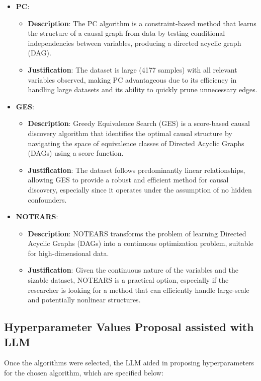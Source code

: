 \documentclass{article}
\begin{document}
\begin{itemize}

\item \textbf{PC}:
\begin{itemize}
    \item \textbf{Description}: The PC algorithm is a constraint-based method that learns the structure of a causal graph from data by testing conditional independencies between variables, producing a directed acyclic graph (DAG).
    \item \textbf{Justification}: The dataset is large (4177 samples) with all relevant variables observed, making PC advantageous due to its efficiency in handling large datasets and its ability to quickly prune unnecessary edges.
\end{itemize}

\item \textbf{GES}:
\begin{itemize}
    \item \textbf{Description}: Greedy Equivalence Search (GES) is a score-based causal discovery algorithm that identifies the optimal causal structure by navigating the space of equivalence classes of Directed Acyclic Graphs (DAGs) using a score function.
    \item \textbf{Justification}: The dataset follows predominantly linear relationships, allowing GES to provide a robust and efficient method for causal discovery, especially since it operates under the assumption of no hidden confounders.
\end{itemize}

\item \textbf{NOTEARS}:
\begin{itemize}
    \item \textbf{Description}: NOTEARS transforms the problem of learning Directed Acyclic Graphs (DAGs) into a continuous optimization problem, suitable for high-dimensional data.
    \item \textbf{Justification}: Given the continuous nature of the variables and the sizable dataset, NOTEARS is a practical option, especially if the researcher is looking for a method that can efficiently handle large-scale and potentially nonlinear structures.
\end{itemize}

\end{itemize}
                    

\subsection{Hyperparameter Values Proposal assisted with LLM}
Once the algorithms were selected, the LLM aided in proposing hyperparameters 
for the chosen algorithm, which are specified below:
        
\end{document}
